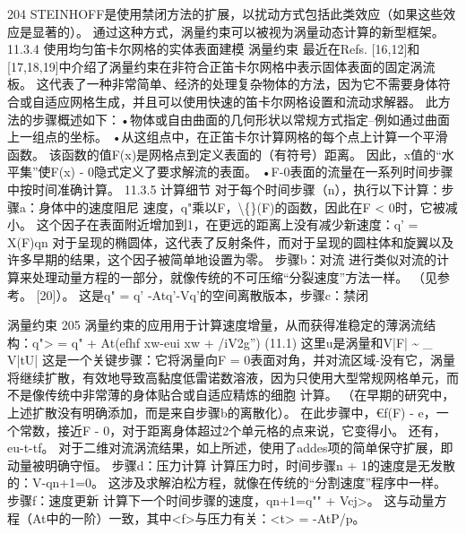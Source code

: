 \documentclass[UTF8,11pt,a4paper,openany,fontset=fandol]{ctexbook}
\begin{document}
204 STEINHOFF是使用禁闭方法的扩展，以扰动方式包括此类效应（如果这些效应是显著的）。 通过这种方式，涡量约束可以被视为涡量动态计算的新型框架。 11.3.4 使用均匀笛卡尔网格的实体表面建模 涡量约束 最近在Refs. [16,12]和[17,18,19]中介绍了涡量约束在非符合正笛卡尔网格中表示固体表面的固定涡流板。 这代表了一种非常简单、经济的处理复杂物体的方法，因为它不需要身体符合或自适应网格生成，并且可以使用快速的笛卡尔网格设置和流动求解器。 此方法的步骤概述如下：•物体或自由曲面的几何形状以常规方式指定--例如通过曲面上一组点的坐标。 •从这组点中，在正笛卡尔计算网格的每个点上计算一个平滑函数。 该函数的值F(x)是网格点到定义表面的（有符号）距离。 因此，x值的“水平集”使F(x) - 0隐式定义了要求解流的表面。 •F-0表面的流量在一系列时间步骤中按时间准确计算。 11.3.5 计算细节 对于每个时间步骤（n），执行以下计算：步骤a：身体中的速度阻尼 速度，q"乘以F，\textbackslash\{\}(F)的函数，因此在F < 0时，它被减小。 这个因子在表面附近增加到1，在更远的距离上没有减少新速度：q' = X(F)qn 对于呈现的椭圆体，这代表了反射条件，而对于呈现的圆柱体和旋翼以及许多早期的结果，这个因子被简单地设置为零。 步骤b：对流 进行类似对流的计算来处理动量方程的一部分，就像传统的不可压缩“分裂速度”方法一样。 （见参考。 [20]）。 这是q" = q' -Atq'-Vq'的空间离散版本，步骤c：禁闭

涡量约束 205 涡量约束的应用用于计算速度增量，从而获得准稳定的薄涡流结构：q"> = q" + At(efhf xw-eui xw + /iV2g”) (11.1) 这里u是涡量和V|F| \textasciitilde{} \_ V|tU| 这是一个关键步骤：它将涡量向F = 0表面对角，并对流区域-没有它，涡量将继续扩散，有效地导致高黏度低雷诺数溶液，因为只使用大型常规网格单元，而不是像传统中非常薄的身体贴合或自适应精炼的细胞 计算。 （在早期的研究中，上述扩散没有明确添加，而是来自步骤b的离散化）。 在此步骤中，€f(F) - e，一个常数，接近F - 0，对于距离身体超过2个单元格的点来说，它变得小。 还有，eu-t-tf。 对于二维对流涡流结果，如上所述，使用了addes项的简单保守扩展，即动量被明确守恒。 步骤d：压力计算 计算压力时，时间步骤n + 1的速度是无发散的：V-qn+1=0。 这涉及求解泊松方程，就像在传统的“分割速度”程序中一样。 步骤f：速度更新 计算下一个时间步骤的速度，qn+1=q"" + Vcj>。 这与动量方程（At中的一阶）一致，其中<f>与压力有关：<t> = -AtP/p。
\end{document}
